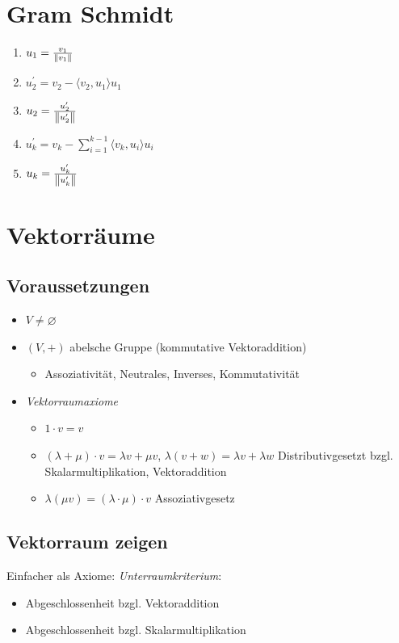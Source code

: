 \section{Gram Schmidt}
\begin{enumerate}
    \item $u_1 = \frac{v_1}{\left\lVert v_1\right\rVert}$
    \item $u_2^\prime = v_2 - \langle v_2,u_1 \rangle u_1$
    \item $u_2 = \frac{u_2^\prime}{\left\lVert u_2^\prime\right\rVert}$
    \item $u_k^\prime = v_k - \sum_{i=1}^{k-1}\langle v_k,u_i\rangle u_i$
    \item $u_k = \frac{u_k^\prime}{\left\lVert u_k^\prime\right\rVert}$
\end{enumerate}

\section{Vektorräume}
\subsection{Voraussetzungen}
\begin{itemize}
    \item $V \neq \varnothing$
    \item $(V,+)$ abelsche Gruppe (kommutative Vektoraddition)
        \begin{itemize}
            \item Assoziativität, Neutrales, Inverses, Kommutativität
        \end{itemize}
    \item \emph{Vektorraumaxiome}
        \begin{itemize}
            \item $1 \cdot v = v$
                \item $(\lambda + \mu)\cdot v = \lambda v + \mu v$,  $\lambda (v + w) = \lambda v + \lambda w$ Distributivgesetzt bzgl. Skalarmultiplikation, Vektoraddition
            \item  $\lambda (\mu v) = (\lambda \cdot \mu) \cdot v$ Assoziativgesetz
        \end{itemize}
\end{itemize}

\subsection{Vektorraum zeigen}
Einfacher als Axiome: \emph{Unterraumkriterium}:
\begin{itemize}
    \item Abgeschlossenheit bzgl. Vektoraddition
    \item Abgeschlossenheit bzgl. Skalarmultiplikation
\end{itemize}